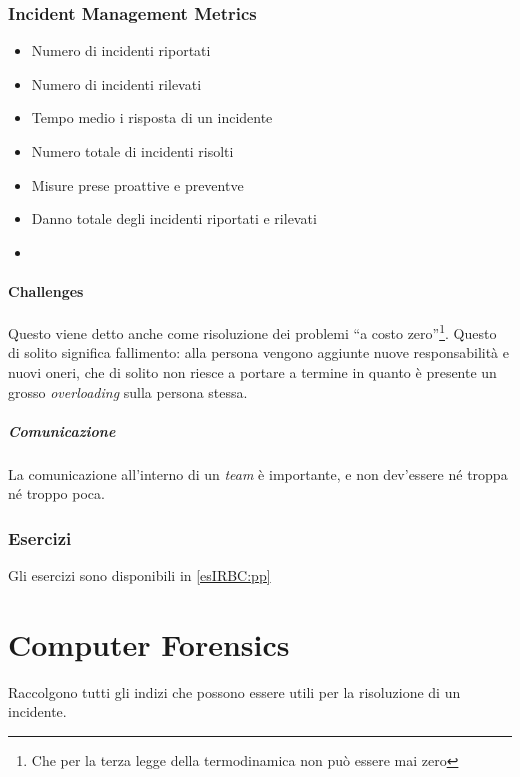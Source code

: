 \subsection{Incident Management Metrics}
\begin{itemize}
\item Numero di incidenti riportati
\item Numero di incidenti rilevati
\item Tempo medio i risposta di un incidente
\item Numero totale di incidenti risolti
\item Misure prese proattive e preventve
\item Danno totale degli incidenti riportati e rilevati
\item {}
\end{itemize}

\subsubsection{Challenges} %

Questo viene detto anche come risoluzione dei problemi ``a costo
zero''\footnote{Che per la terza legge della termodinamica non può essere mai
zero}. Questo di solito significa fallimento: alla persona vengono aggiunte
nuove responsabilità e nuovi oneri, che di solito non riesce a portare a termine
in quanto è presente un grosso \textit{overloading} sulla persona stessa.

\paragraph*{Comunicazione} La comunicazione all'interno di un \textit{team} è
importante, e non dev'essere né troppa né troppo poca.

\subsection{Esercizi}

Gli esercizi sono disponibili in \ref{esIRBC:pp}

\chapter{Computer Forensics}
\label{IRBC:cf}

Raccolgono tutti gli indizi che possono essere utili per la risoluzione di un
incidente.

